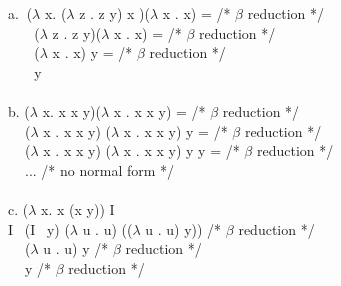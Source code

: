 a. $~$($\lambda$ x. ($\lambda$ z . z y) x )($\lambda$ x . x) =  /* $\beta$ reduction */ \\
    $~~~~~~~$ ($\lambda$ z . z y)($\lambda$ x . x) = /* $\beta$ reduction */ \\
    $~~~~~~~$ ($\lambda$ x . x) y = /* $\beta$ reduction */ \\
    $~~~~~~~$ y\\
\\
b. ($\lambda$ x. x x y)($\lambda$ x . x x y) = /* $\beta$ reduction */ \\
    $~~~~$ ($\lambda$ x . x x y) ($\lambda$ x . x x y) y = /* $\beta$ reduction */ \\
    $~~~~$ ($\lambda$ x . x x y) ($\lambda$ x . x x y) y y = /* $\beta$ reduction */ \\
    $~~~~$ ... /* no normal form */
\\
\\
c.  ($\lambda$ x. x (x y)) I\\
I~ (I~ y)  ($\lambda$ u . u) (($\lambda$ u . u) y)) /* $\beta$ reduction */ \\
$~~~~$ ($\lambda$ u . u) y /* $\beta$ reduction */ \\
$~~~~$ y /* $\beta$ reduction */ \\
